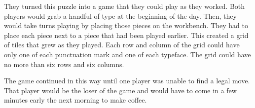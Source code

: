 \documentclass[a4paper, DIV=15]{scrartcl}
\begin{document}
\begin{pullquote}
They turned this puzzle into a game that they could play as they worked. Both players would grab a handful of type at the beginning of the day. Then, they would take turns playing by placing those pieces on the workbench. They had to place each piece next to a piece that had been played earlier. This created a grid of tiles that grew as they played. Each row and column of the grid could have only one of each punctuation mark and one of each typeface. The grid could have no more than six rows and six columns.

The game continued in this way until one player was unable to find a legal move. That player would be the loser of the game and would have to come in a few minutes early the next morning to make coffee.

\end{pullquote}
\end{document}
